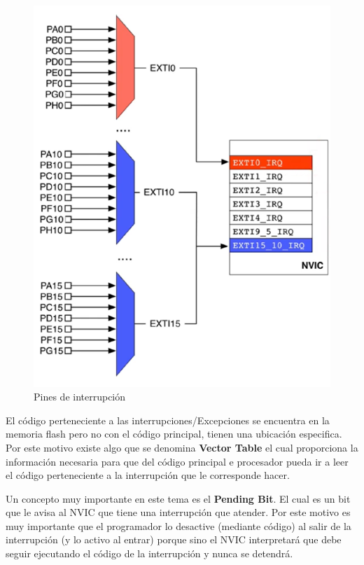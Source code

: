 \documentclass[a4paper,12pt]{report} %
\begin{document}
\begin{figure}[H]
	\centering
	\includegraphics[scale=0.5]{Imagenes/stm/NVIC_interrup}
	\caption{Pines de interrupción}
	\label{NVIC}
\end{figure}

El código perteneciente a las interrupciones/Excepciones se encuentra en la memoria flash pero no con el código principal, tienen una ubicación especifica. Por este motivo existe algo que se denomina \textbf{Vector Table} el cual proporciona la información necesaria para que del código principal e procesador pueda ir a leer el código perteneciente a la interrupción que le corresponde hacer.

Un concepto muy importante en este tema es el \textbf{Pending Bit}. El cual es un bit que le avisa al NVIC que tiene una interrupción que atender. Por este motivo es muy importante que el programador lo desactive (mediante código) al salir de la interrupción (y lo activo al entrar) porque sino el NVIC interpretará que debe seguir ejecutando el código de la interrupción y nunca se detendrá.
\end{document}
